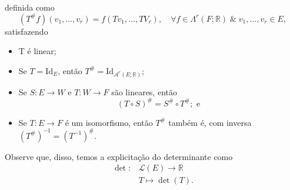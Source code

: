 \documentclass[../differential_forms.tex]{subfiles}
\begin{document}
definida como
\[
	(T^{\#}f)(v_1,\dotsc ,v_r)= f(Tv_1,\dotsc ,TV_r),\quad \forall f\in \Lambda ^{r}(F; \mathbb{R})\;\&\; v_1,\dotsc ,v_r\in E,
\]
satisfazendo
\begin{itemize}
	\item T é linear;
	\item Se \(T = \mathrm{Id}_E\), então \(T^{\#} = \mathrm{Id}_{\mathcal{A}^{r}(E; \mathbb{R})}\);
	\item Se \(S:E\rightarrow W\) e \(T:W\rightarrow F\) são lineares, então
	      \[
		      (T\circ S)^{ \#} = S^{\#}\circ T^{\#}; \text{ e }
	      \]
	\item Se \(T:E\rightarrow F\) é um isomorfismo, então \(T^{\#}\) também é, com inversa \((T^{\#})^{-1}=(T^{-1})^{\#}\).
\end{itemize}
Observe que, disso, temos a explicitação do determinante como
\begin{align*}
	\det{}: & \mathcal{L}(E)\rightarrow\mathbb{R} \\
	        & T\longmapsto \det{(T)}.
\end{align*}
\end{document}
